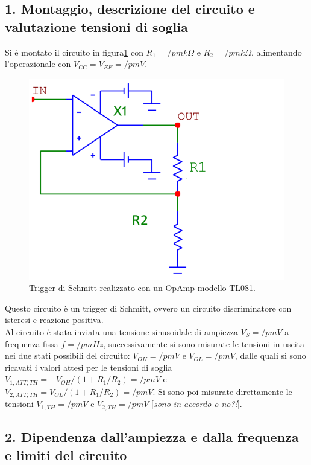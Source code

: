 \documentclass[10pt,a4paper]{article}
\newcommand{\rem}[1]{[\emph{#1}]}
\begin{document}
\subsection{1. Montaggio, descrizione del circuito e valutazione tensioni di soglia}
Si è montato il circuito in figura\ref{circuito3} con $R_1 = /pm k\Omega$ e $R_2 = /pm k\Omega$, alimentando l'operazionale con $V_{CC}=V_{EE}= /pm V$.\\
\begin{figure}[h]
\centering
\includegraphics[scale=0.5]{triggerSchmitt.png}
\caption{ Trigger di Schmitt realizzato con un OpAmp modello TL081.\label{circuito3}}
\end{figure}

Questo circuito è un trigger di Schmitt, ovvero un circuito discriminatore con isteresi e reazione positiva.\\
Al circuito è stata inviata una tensione sinusoidale di ampiezza $V_S = /pm V$ a frequenza fissa $f = /pm Hz$, successivamente si sono misurate le tensioni in uscita nei due stati possibili del circuito: $V_{OH} = /pm V$ e $V_{OL} = /pm V$, dalle quali si sono ricavati i valori attesi per le tensioni di soglia $V_{1,ATT,TH}= -V_{OH}/(1+R_1/R_2)= /pm V$ e $V_{2,ATT,TH}= V_{OL}/(1+R_1/R_2) = /pm V$. Si sono poi misurate direttamente le tensioni $V_{1,TH}= /pm V$ e $V_{2,TH} = /pm V$ \rem{sono in accordo o no?!}.\\

\subsection*{2. Dipendenza dall'ampiezza e dalla frequenza e limiti del circuito}
\end{document}
